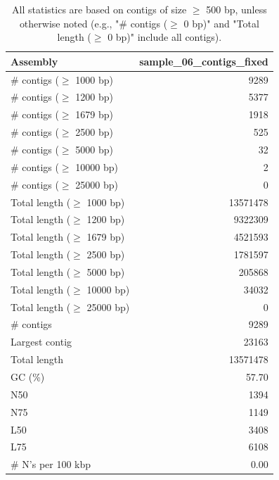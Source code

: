 \documentclass[12pt,a4paper]{article}
\begin{document}
\begin{table}[ht]
\begin{center}
\caption{All statistics are based on contigs of size $\geq$ 500 bp, unless otherwise noted (e.g., "\# contigs ($\geq$ 0 bp)" and "Total length ($\geq$ 0 bp)" include all contigs).}
\begin{tabular}{|l*{1}{|r}|}
\hline
Assembly & sample\_06\_contigs\_fixed \\ \hline
\# contigs ($\geq$ 1000 bp) & 9289 \\ \hline
\# contigs ($\geq$ 1200 bp) & 5377 \\ \hline
\# contigs ($\geq$ 1679 bp) & 1918 \\ \hline
\# contigs ($\geq$ 2500 bp) & 525 \\ \hline
\# contigs ($\geq$ 5000 bp) & 32 \\ \hline
\# contigs ($\geq$ 10000 bp) & 2 \\ \hline
\# contigs ($\geq$ 25000 bp) & 0 \\ \hline
Total length ($\geq$ 1000 bp) & 13571478 \\ \hline
Total length ($\geq$ 1200 bp) & 9322309 \\ \hline
Total length ($\geq$ 1679 bp) & 4521593 \\ \hline
Total length ($\geq$ 2500 bp) & 1781597 \\ \hline
Total length ($\geq$ 5000 bp) & 205868 \\ \hline
Total length ($\geq$ 10000 bp) & 34032 \\ \hline
Total length ($\geq$ 25000 bp) & 0 \\ \hline
\# contigs & 9289 \\ \hline
Largest contig & 23163 \\ \hline
Total length & 13571478 \\ \hline
GC (\%) & 57.70 \\ \hline
N50 & 1394 \\ \hline
N75 & 1149 \\ \hline
L50 & 3408 \\ \hline
L75 & 6108 \\ \hline
\# N's per 100 kbp & 0.00 \\ \hline
\end{tabular}
\end{center}
\end{table}
\end{document}
